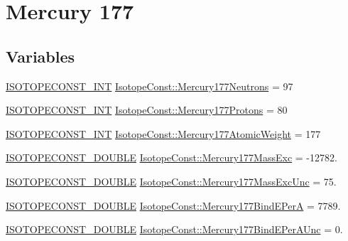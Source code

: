 \hypertarget{group___isotope_const-_mercury-_hg177}{}\section{Mercury 177}
\label{group___isotope_const-_mercury-_hg177}
\subsection*{Variables}
\begin{DoxyCompactItemize}
\item 
\mbox{\hyperlink{group___isotope_const-_macros_ga5f18360b3e99483a35c32d789e62621c}{I\+S\+O\+T\+O\+P\+E\+C\+O\+N\+S\+T\+\_\+\+I\+NT}} \mbox{\hyperlink{group___isotope_const-_mercury-_hg177_ga638a116ef306ce26ec70f193e71e9658}{Isotope\+Const\+::\+Mercury177\+Neutrons}} = 97
\item 
\mbox{\hyperlink{group___isotope_const-_macros_ga5f18360b3e99483a35c32d789e62621c}{I\+S\+O\+T\+O\+P\+E\+C\+O\+N\+S\+T\+\_\+\+I\+NT}} \mbox{\hyperlink{group___isotope_const-_mercury-_hg177_ga68cc2c1ab18b6afeb35172c21bbdf88f}{Isotope\+Const\+::\+Mercury177\+Protons}} = 80
\item 
\mbox{\hyperlink{group___isotope_const-_macros_ga5f18360b3e99483a35c32d789e62621c}{I\+S\+O\+T\+O\+P\+E\+C\+O\+N\+S\+T\+\_\+\+I\+NT}} \mbox{\hyperlink{group___isotope_const-_mercury-_hg177_ga0df81440e0b2c5a295667e5da7839fe9}{Isotope\+Const\+::\+Mercury177\+Atomic\+Weight}} = 177
\item 
\mbox{\hyperlink{group___isotope_const-_macros_ga8f45a7272ce02c0b4c65c44636ed719a}{I\+S\+O\+T\+O\+P\+E\+C\+O\+N\+S\+T\+\_\+\+D\+O\+U\+B\+LE}} \mbox{\hyperlink{group___isotope_const-_mercury-_hg177_gada90b83e3fe99e7775c077587bee0019}{Isotope\+Const\+::\+Mercury177\+Mass\+Exc}} = -\/12782.
\item 
\mbox{\hyperlink{group___isotope_const-_macros_ga8f45a7272ce02c0b4c65c44636ed719a}{I\+S\+O\+T\+O\+P\+E\+C\+O\+N\+S\+T\+\_\+\+D\+O\+U\+B\+LE}} \mbox{\hyperlink{group___isotope_const-_mercury-_hg177_ga0195ef18ef4e9a5d3e5306f62c2c149f}{Isotope\+Const\+::\+Mercury177\+Mass\+Exc\+Unc}} = 75.
\item 
\mbox{\hyperlink{group___isotope_const-_macros_ga8f45a7272ce02c0b4c65c44636ed719a}{I\+S\+O\+T\+O\+P\+E\+C\+O\+N\+S\+T\+\_\+\+D\+O\+U\+B\+LE}} \mbox{\hyperlink{group___isotope_const-_mercury-_hg177_gad4069e299a49d5f4fb64b29d8d4d8156}{Isotope\+Const\+::\+Mercury177\+Bind\+E\+PerA}} = 7789.
\item 
\mbox{\hyperlink{group___isotope_const-_macros_ga8f45a7272ce02c0b4c65c44636ed719a}{I\+S\+O\+T\+O\+P\+E\+C\+O\+N\+S\+T\+\_\+\+D\+O\+U\+B\+LE}} \mbox{\hyperlink{group___isotope_const-_mercury-_hg177_ga4a2e615db74cf7766e01a98b396258b1}{Isotope\+Const\+::\+Mercury177\+Bind\+E\+Per\+A\+Unc}} = 0.

\end{DoxyCompactItemize}
